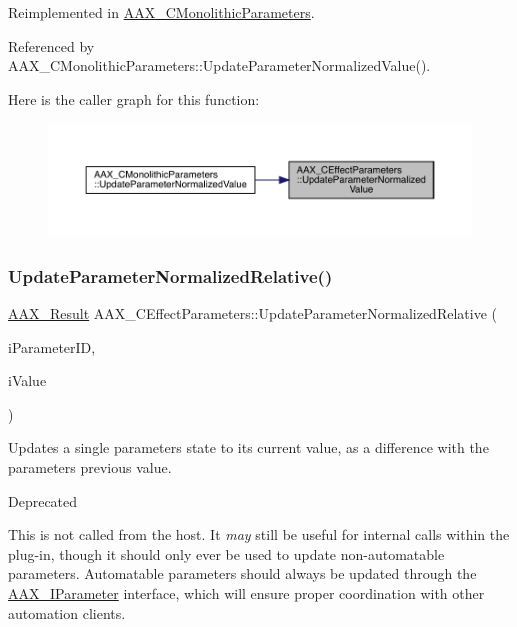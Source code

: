 Reimplemented in \mbox{\hyperlink{a01969_a9ef4fd6fa467008fcea4455d19c08009}{A\+A\+X\+\_\+\+C\+Monolithic\+Parameters}}.



Referenced by A\+A\+X\+\_\+\+C\+Monolithic\+Parameters\+::\+Update\+Parameter\+Normalized\+Value().

Here is the caller graph for this function\+:
\nopagebreak
\begin{figure}[H]
\begin{center}
\leavevmode
\includegraphics[width=350pt]{a01481_aeff79c1e5cc6b65c7ed21d9912f87caf_icgraph}
\end{center}
\end{figure}
\mbox{\label{a01481_aa2e14fdf26352f16f3b0c437bc0894cb}} 
\subsubsection{\texorpdfstring{UpdateParameterNormalizedRelative()}{UpdateParameterNormalizedRelative()}}
{\footnotesize\ttfamily \mbox{\hyperlink{a00392_a4d8f69a697df7f70c3a8e9b8ee130d2f}{A\+A\+X\+\_\+\+Result}} A\+A\+X\+\_\+\+C\+Effect\+Parameters\+::\+Update\+Parameter\+Normalized\+Relative (\begin{DoxyParamCaption}\item[{\mbox{\hyperlink{a00392_a1440c756fe5cb158b78193b2fc1780d1}{A\+A\+X\+\_\+\+C\+Param\+ID}}}]{i\+Parameter\+ID,  }\item[{double}]{i\+Value }\end{DoxyParamCaption})\hspace{0.3cm}{\ttfamily [virtual]}}



Updates a single parameter\textquotesingle{}s state to its current value, as a difference with the parameter\textquotesingle{}s previous value. 

\begin{DoxyRefDesc}{Deprecated}
\item[\mbox{\hyperlink{a00788__deprecated000013}{Deprecated}}]This is not called from the host. It {\itshape may} still be useful for internal calls within the plug-\/in, though it should only ever be used to update non-\/automatable parameters. Automatable parameters should always be updated through the \mbox{\hyperlink{a01857}{A\+A\+X\+\_\+\+I\+Parameter}} interface, which will ensure proper coordination with other automation clients.\end{DoxyRefDesc}


